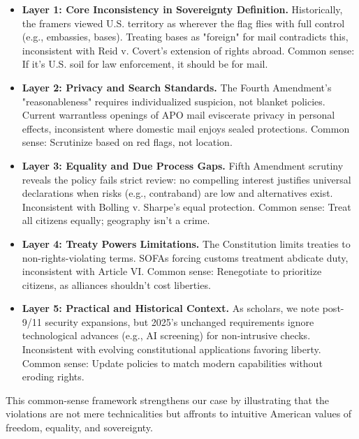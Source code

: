 \begin{itemize}
\item \textbf{Layer 1: Core Inconsistency in Sovereignty Definition.}
Historically, the framers viewed U.S. territory as wherever the flag flies with full control (e.g., embassies, bases). Treating bases as "foreign" for mail contradicts this, inconsistent with Reid v. Covert's extension of rights abroad. Common sense: If it's U.S. soil for law enforcement, it should be for mail.

\item \textbf{Layer 2: Privacy and Search Standards.}
The Fourth Amendment's "reasonableness" requires individualized suspicion, not blanket policies. Current warrantless openings of APO mail eviscerate privacy in personal effects, inconsistent where domestic mail enjoys sealed protections. Common sense: Scrutinize based on red flags, not location.

\item \textbf{Layer 3: Equality and Due Process Gaps.}
Fifth Amendment scrutiny reveals the policy fails strict review: no compelling interest justifies universal declarations when risks (e.g., contraband) are low and alternatives exist. Inconsistent with Bolling v. Sharpe's equal protection. Common sense: Treat all citizens equally; geography isn't a crime.

\item \textbf{Layer 4: Treaty Powers Limitations.}
The Constitution limits treaties to non-rights-violating terms. SOFAs forcing customs treatment abdicate duty, inconsistent with Article VI. Common sense: Renegotiate to prioritize citizens, as alliances shouldn't cost liberties.

\item \textbf{Layer 5: Practical and Historical Context.}
As scholars, we note post-9/11 security expansions, but 2025's unchanged requirements ignore technological advances (e.g., AI screening) for non-intrusive checks. Inconsistent with evolving constitutional applications favoring liberty. Common sense: Update policies to match modern capabilities without eroding rights.
\end{itemize}

This common-sense framework strengthens our case by illustrating that the violations are not mere technicalities but affronts to intuitive American values of freedom, equality, and sovereignty.
